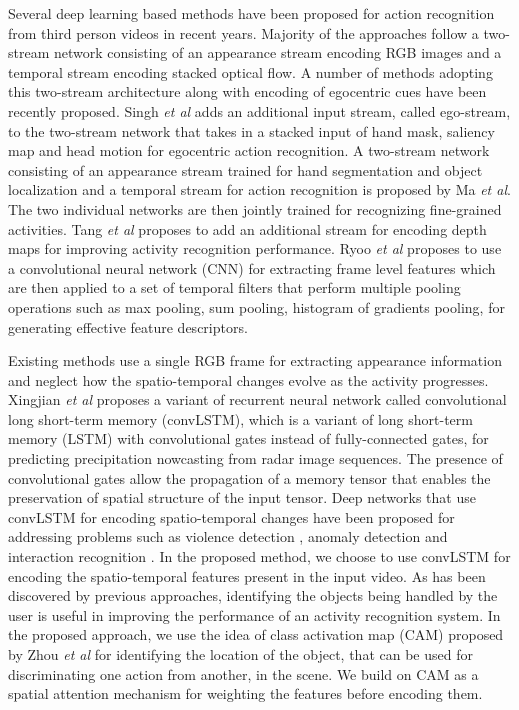 \documentclass{bmvc2k}
\def\etal{\emph{et al}\bmvaOneDot}
\begin{document}
Several deep learning based methods have been proposed for action recognition from third person videos in recent years. Majority of the approaches follow a two-stream network \cite{simonyan2014two} \cite{TSN2016ECCV} \cite{carreira2017quo} consisting of an appearance stream encoding RGB images and a temporal stream encoding stacked optical flow. A number of methods adopting this two-stream architecture along with encoding of egocentric cues have been recently proposed. Singh \etal \cite{singh2016first} adds an additional input stream, called ego-stream, to the two-stream network that takes in a stacked input of hand mask, saliency map and head motion for egocentric action recognition. A two-stream network consisting of an appearance stream trained for hand segmentation and object localization and a temporal stream for action recognition is proposed by Ma \etal \cite{ma2016deeper}. The two individual networks are then jointly trained for recognizing fine-grained activities. Tang \etal \cite{tang2017action} proposes to add an additional stream for encoding depth maps for improving activity recognition performance. Ryoo \etal \cite{ryoo2015pooled} proposes to use a convolutional neural network (CNN) for extracting frame level features which are then applied to a set of temporal filters that perform multiple pooling operations such as max pooling, sum pooling, histogram of gradients pooling, for generating effective feature descriptors.

Existing methods use a single RGB frame for extracting appearance information and neglect how the spatio-temporal changes evolve as the activity progresses. Xingjian \etal \cite{xingjian2015convolutional} proposes a variant of recurrent neural network called convolutional long short-term memory (convLSTM), which is a variant of long short-term memory (LSTM) \cite{hochreiter1997long} with convolutional gates instead of fully-connected gates, for predicting precipitation nowcasting from radar image sequences. The presence of convolutional gates allow the propagation of a memory tensor that enables the preservation of spatial structure of the input tensor. Deep networks that use convLSTM for encoding spatio-temporal changes have been proposed for addressing problems such as violence detection \cite{sudhakaran2017learning}, anomaly detection \cite{medel2016anomaly} and interaction recognition \cite{Sudhakaran_2017_ICCV}. In the proposed method, we choose to use convLSTM for encoding the spatio-temporal features present in the input video. As has been discovered by previous approaches, identifying the objects being handled by the user is useful in improving the performance of an activity recognition system. In the proposed approach, we use the idea of class activation map (CAM) proposed by Zhou \etal \cite{zhou2016learning} for identifying the location of the object, that can be used for discriminating one action from another, in the scene. We build on CAM as a spatial attention mechanism for weighting the features before encoding them.
\end{document}
